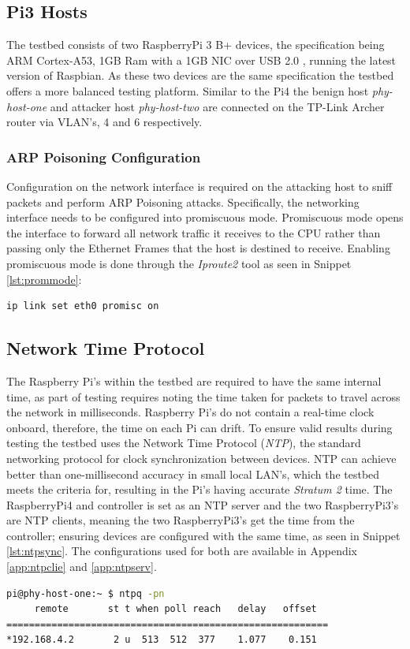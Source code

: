 \documentclass[12pt, oneside]{book}
\begin{document}
\subsection{Pi3 Hosts}
The testbed consists of two RaspberryPi 3 B+ devices, the specification being ARM Cortex-A53, 1GB Ram
with a 1GB NIC over USB 2.0 \cite{raspberrypi3}, running the latest version of Raspbian. As these two devices
are the same specification the testbed offers a more balanced testing platform. Similar to the Pi4 the
benign host \emph{phy-host-one} and attacker host \emph{phy-host-two} are 
connected on the TP-Link Archer router via VLAN's, 4 and 6 respectively.

\subsubsection{ARP Poisoning Configuration}
Configuration on the network interface is required on the attacking host to sniff packets and perform ARP Poisoning attacks.
Specifically, the networking interface needs to be configured into promiscuous mode.
Promiscuous mode opens the interface to forward all network traffic it receives to the CPU rather than
passing only the Ethernet Frames that the host is destined to receive. 
Enabling promiscuous mode is done through the \emph{Iproute2} tool as seen in Snippet \ref{lst:prommode}:
\begin{lstlisting}[language=Bash,caption={Enable Promiscuous Mode},captionpos=b,label={lst:prommode}]
ip link set eth0 promisc on
\end{lstlisting}


\newpage
\subsection{Network Time Protocol}
The Raspberry Pi's within the testbed are required to have the same internal time, as part of testing requires noting the time 
taken for packets to travel across the network in milliseconds. Raspberry Pi's do not contain a real-time clock onboard, therefore,
the time on each Pi can drift. To ensure valid results during testing the testbed uses
the Network Time Protocol (\emph{NTP}), the standard networking protocol for clock synchronization between
devices. NTP can achieve better than one-millisecond accuracy in small local LAN's,
which the testbed meets the criteria for, resulting in the Pi's having accurate \emph{Stratum 2} time.
The RaspberryPi4 and controller is set as an NTP server and the two RaspberryPi3's
are NTP clients, meaning the two RaspberryPi3's get the time from the controller; ensuring devices are configured
with the same time, as seen in Snippet \ref{lst:ntpsync}.
The configurations used for both are available in Appendix \ref{app:ntpclie} and \ref{app:ntpserv}. 
\begin{lstlisting}[language=Bash,caption={NTP Sync to Controller},captionpos=b,label={lst:ntpsync}]
pi@phy-host-one:~ $ ntpq -pn
     remote       st t when poll reach   delay   offset
=========================================================
*192.168.4.2       2 u  513  512  377    1.077    0.151
\end{lstlisting}
\end{document}
